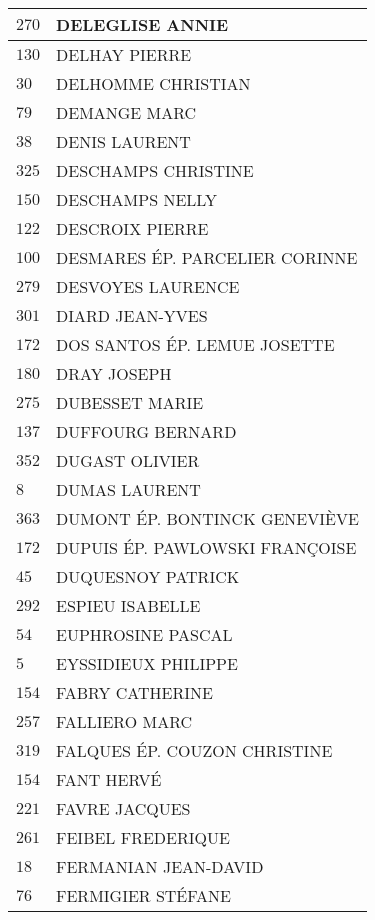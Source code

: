 \begin{xltabular}{\linewidth}{|l|X|}
    $270$ & DELEGLISE ANNIE \\
    \hline
    $130$ & DELHAY PIERRE \\
    \hline
    $30$ & DELHOMME CHRISTIAN \\
    \hline
    $79$ & DEMANGE MARC \\
    \hline
    $38$ & DENIS LAURENT \\
    \hline
    $325$ & DESCHAMPS CHRISTINE \\
    \hline
    $150$ & DESCHAMPS NELLY \\
    \hline
    $122$ & DESCROIX PIERRE \\
    \hline
    $100$ & DESMARES ÉP. PARCELIER CORINNE \\
    \hline
    $279$ & DESVOYES LAURENCE \\
    \hline
    $301$ & DIARD JEAN-YVES \\
    \hline
    $172$ & DOS SANTOS ÉP. LEMUE JOSETTE \\
    \hline
    $180$ & DRAY JOSEPH \\
    \hline
    $275$ & DUBESSET MARIE \\
    \hline
    $137$ & DUFFOURG BERNARD \\
    \hline
    $352$ & DUGAST OLIVIER \\
    \hline
    $8$ & DUMAS LAURENT \\
    \hline
    $363$ & DUMONT ÉP. BONTINCK GENEVIÈVE \\
    \hline
    $172$ & DUPUIS ÉP. PAWLOWSKI FRANÇOISE \\
    \hline
    $45$ & DUQUESNOY PATRICK \\
    \hline
    $292$ & ESPIEU ISABELLE \\
    \hline
    $54$ & EUPHROSINE PASCAL \\
    \hline
    $5$ & EYSSIDIEUX PHILIPPE \\
    \hline
    $154$ & FABRY CATHERINE \\
    \hline
    $257$ & FALLIERO MARC \\
    \hline
    $319$ & FALQUES ÉP. COUZON CHRISTINE \\
    \hline
    $154$ & FANT HERVÉ \\
    \hline
    $221$ & FAVRE JACQUES \\
    \hline
    $261$ & FEIBEL FREDERIQUE \\
    \hline
    $18$ & FERMANIAN JEAN-DAVID \\
    \hline
    $76$ & FERMIGIER STÉFANE \\
    \hline

\end{xltabular}
